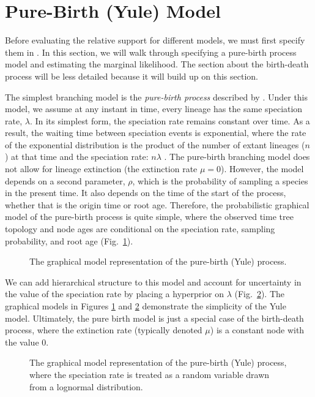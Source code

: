 

\bigskip
\section{Pure-Birth (Yule) Model}\label{yuleModSec}

Before evaluating the relative support for different models, we must first specify them in \Rev.
In this section, we will walk through specifying a pure-birth process model and estimating the marginal likelihood.
The section about the birth-death process will be less detailed because it will build up on this section.

The simplest branching model is the \emph{pure-birth process} described by \cite{Yule1925}.
Under this model, we assume at any instant in time, every lineage has the same speciation rate, $\lambda$.
In its simplest form, the speciation rate remains constant over time.
As a result, the waiting time between speciation events is exponential, where the rate of the exponential distribution is the product of the number of extant lineages ($n$) at that time and the speciation rate: $n\lambda$ \citep{Yule1925,Aldous2001,Hoehna2014a}.
The pure-birth branching model does not allow for lineage extinction (\IE the extinction rate $\mu=0$).
However, the model depends on a second parameter, $\rho$, which is the probability of sampling a species in the present time.
It also depends on the time of the start of the process, whether that is the origin time or root age.
Therefore, the probabilistic graphical model of the pure-birth process is quite simple, where the observed time tree topology and node ages are conditional on the speciation rate, sampling probability, and root age (Fig.~\ref{fig:yule_gm}).
\begin{figure}[h!]
\centering
{}
\caption{\small The graphical model representation of the pure-birth (Yule) process.}
\label{fig:yule_gm}
\end{figure}

We can add hierarchical structure to this model and account for uncertainty in the value of the speciation rate by placing a hyperprior on $\lambda$ (Fig.~\ref{fig:yule_gm2}).
The graphical models in Figures \ref{fig:yule_gm} and \ref{fig:yule_gm2} demonstrate the simplicity of the Yule model.
Ultimately, the pure birth model is just a special case of the birth-death process, where the extinction rate (typically denoted $\mu$) is a constant node with the value 0.
\begin{figure}[h!]
\centering
{}
\caption{\small The graphical model representation of the pure-birth (Yule) process, where the speciation rate is treated as a random variable drawn from a lognormal distribution.}
\label{fig:yule_gm2}
\end{figure}

